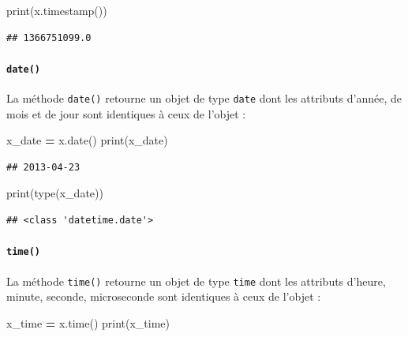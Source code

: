 \documentclass[12pt,]{book}
\newenvironment{Shaded}{\begin{snugshade}}{\end{snugshade}}
\newcommand{\OperatorTok}[1]{\textcolor[rgb]{0.81,0.36,0.00}{\textbf{#1}}}
\newcommand{\BuiltInTok}[1]{#1}
\newcommand{\NormalTok}[1]{#1}
\let\oldparagraph\paragraph
\renewcommand{\paragraph}[1]{\oldparagraph{#1}\mbox{}}
\numberwithin{equation}{section}
\numberwithin{countremarque}{section}
\begin{document}
\begin{Shaded}
\begin{Highlighting}[]
\BuiltInTok{print}\NormalTok{(x.timestamp())}
\end{Highlighting}
\end{Shaded}

\begin{lstlisting}
## 1366751099.0
\end{lstlisting}

\paragraph{\texorpdfstring{\texttt{date()}}{date()}}\label{date}

La méthode \texttt{date()} retourne un objet de type \texttt{date} dont
les attributs d'année, de mois et de jour sont identiques à ceux de
l'objet :

\begin{Shaded}
\begin{Highlighting}[]
\NormalTok{x_date }\OperatorTok{=}\NormalTok{ x.date()}
\BuiltInTok{print}\NormalTok{(x_date)}
\end{Highlighting}
\end{Shaded}

\begin{lstlisting}
## 2013-04-23
\end{lstlisting}

\begin{Shaded}
\begin{Highlighting}[]
\BuiltInTok{print}\NormalTok{(}\BuiltInTok{type}\NormalTok{(x_date))}
\end{Highlighting}
\end{Shaded}

\begin{lstlisting}
## <class 'datetime.date'>
\end{lstlisting}

\paragraph{\texorpdfstring{\texttt{time()}}{time()}}\label{time}

La méthode \texttt{time()} retourne un objet de type \texttt{time} dont
les attributs d'heure, minute, seconde, microseconde sont identiques à
ceux de l'objet :

\begin{Shaded}
\begin{Highlighting}[]
\NormalTok{x_time }\OperatorTok{=}\NormalTok{ x.time()}
\BuiltInTok{print}\NormalTok{(x_time)}
\end{Highlighting}
\end{Shaded}
\end{document}
